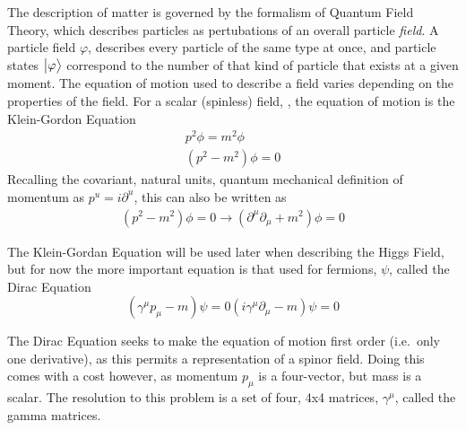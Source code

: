     The description of matter is governed by the formalism of Quantum Field Theory, which describes particles as pertubations of an overall particle \textit{field}.
    A particle field $\varphi$, describes every particle of the same type at once,
        and particle states $\big| \varphi \big>$ correspond to the number of that kind of particle that exists at a given moment.
    The equation of motion used to describe a field varies depending on the properties of the field.
    For a scalar (spinless) field, \phi, the equation of motion is the Klein-Gordon Equation
    \begin{equation} \begin{split}
        p^2 \phi = m^2 \phi
        \\(p^2 - m^2) \phi = 0
    \end{split} \end{equation}
    Recalling the covariant, natural units, quantum mechanical definition of momentum as $p^u = i\partial^u$,
        this can also be written as
    \begin{equation} \begin{split}
        (p^2 - m^2) \phi = 0 \rightarrow (\partial^\mu \partial_\mu + m^2) \phi = 0
    \end{split} \end{equation}

    The Klein-Gordan Equation will be used later when describing the Higgs Field,
        but for now the more important equation is that used for fermions, $\psi$,
        called the Dirac Equation
    \begin{equation}
        (\gamma^\mu p_\mu - m) \psi = 0
        (i\gamma^\mu \partial_\mu  - m) \psi = 0
    \end{equation}

    The Dirac Equation seeks to make the equation of motion first order (i.e.\ only one derivative),
        as this permits a representation of a spinor field.
    Doing this comes with a cost however, as momentum $p_\mu$ is a four-vector, but mass is a scalar.
    The resolution to this problem is a set of four, 4x4 matrices, $\gamma^\mu$, called the gamma matrices.




